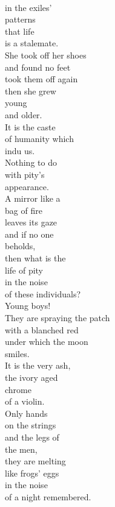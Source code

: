 \documentclass[smalldemyvopaper,11pt,twoside,onecolumn,openright,extrafontsizes]{memoir}
\begin{document}
\\in the exiles'
\\patterns
\\that life
\\is a stalemate.
\\She took off her shoes
\\and found no feet
\\took them off again
\\then she grew
\\young
\\and older.
\\It is the caste
\\of humanity which
\\indu us.
\\Nothing to do
\\with pity's
\\appearance.
\\A mirror like a
\\bag of fire
\\leaves its gaze
\\and if no one
\\beholds,
\\then what is the
\\life of pity
\\in the noise
\\of these individuals?
\\Young boys!
\\They are spraying the patch
\\with a blanched red
\\under which the moon
\\smiles.
\\It is the very ash,
\\the ivory aged
\\chrome
\\of a violin.
\\Only hands
\\on the strings
\\and the legs of
\\the men,
\\they are melting
\\like frogs' eggs
\\in the noise
\\of a night remembered.
\end{document}
